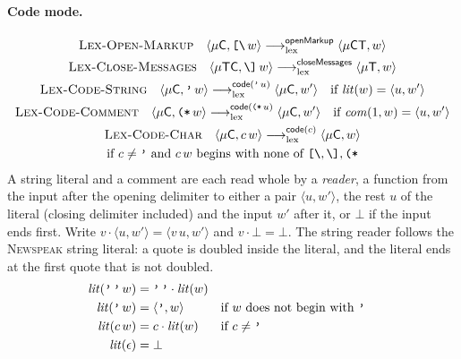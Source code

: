 \documentclass[11pt]{article}
\numberwithin{equation}{section}
\newcommand{\NS}{\textsc{Newspeak}}
\newcommand{\kw}[1]{\ensuremath{\mathsf{#1}}}
\newcommand{\str}[1]{\ensuremath{\text{\texttt{#1}}}}
\newcommand{\bs}{\textbackslash}
\newcommand{\Open}{\str{[\bs}}
\newcommand{\Close}{\str{\bs]}}
\newcommand{\TM}{\kw{T}}
\newcommand{\CM}{\kw{C}}
\newcommand{\lexto}{\longrightarrow_{\mathrm{lex}}}
\newcommand{\rulelabel}[1]{\textsc{#1}}
\begin{document}
\paragraph{Code mode.}
\begin{gather}
\label{eq:lex-open-markup}
\rulelabel{Lex-Open-Markup}\quad
\langle \mu\CM, \Open\,w \rangle \lexto^{\kw{openMarkup}}
  \langle \mu\CM\TM, w \rangle
\\
\label{eq:lex-close-messages}
\rulelabel{Lex-Close-Messages}\quad
\langle \mu\TM\CM, \Close\,w \rangle \lexto^{\kw{closeMessages}}
  \langle \mu\TM, w \rangle
\\
\label{eq:lex-code-string}
\rulelabel{Lex-Code-String}\quad
\langle \mu\CM, \str{'}\,w \rangle \lexto^{\kw{code}(\str{'}\,u)}
  \langle \mu\CM, w' \rangle
  \quad\text{if } \mathit{lit}(w) = \langle u, w' \rangle
\\
\label{eq:lex-code-comment}
\rulelabel{Lex-Code-Comment}\quad
\langle \mu\CM, \str{(*}\,w \rangle \lexto^{\kw{code}(\str{(*}\,u)}
  \langle \mu\CM, w' \rangle
  \quad\text{if } \mathit{com}(1, w) = \langle u, w' \rangle
\\
\label{eq:lex-code-char}
\rulelabel{Lex-Code-Char}\quad
\langle \mu\CM, c\,w \rangle \lexto^{\kw{code}(c)}
  \langle \mu\CM, w \rangle
\notag\\
  \text{if } c \ne \str{'} \text{ and } c\,w \text{ begins with none of }
  \Open, \Close, \str{(*}
\end{gather}
A string literal and a comment are each read whole by a \emph{reader}, a
function from the input after the opening delimiter to either a pair
$\langle u, w' \rangle$, the rest $u$ of the literal (closing delimiter
included) and the input $w'$ after it, or $\bot$ if the input ends first.
Write $v \cdot \langle u, w' \rangle = \langle v\,u, w' \rangle$ and
$v \cdot \bot = \bot$.  The string reader follows the \NS{} string literal:
a quote is doubled inside the literal, and the literal ends at the first
quote that is not doubled.
\begin{equation}\label{eq:string-reader}
\begin{aligned}
\mathit{lit}(\str{'}\,\str{'}\,w) &= \str{'}\,\str{'} \cdot \mathit{lit}(w) \\
\mathit{lit}(\str{'}\,w) &= \langle \str{'}, w \rangle
  && \text{if } w \text{ does not begin with } \str{'} \\
\mathit{lit}(c\,w) &= c \cdot \mathit{lit}(w) && \text{if } c \ne \str{'} \\
\mathit{lit}(\epsilon) &= \bot
\end{aligned}
\end{equation}
\end{document}
